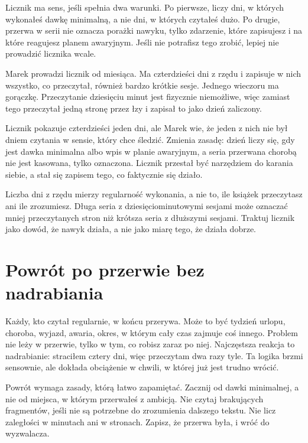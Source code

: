 Licznik ma sens, jeśli spełnia dwa warunki. Po pierwsze, liczy dni, w których wykonałeś dawkę minimalną, a nie dni, w których czytałeś dużo. Po drugie, przerwa w serii nie oznacza porażki nawyku, tylko zdarzenie, które zapisujesz i na które reagujesz planem awaryjnym. Jeśli nie potrafisz tego zrobić, lepiej nie prowadzić licznika wcale.

\begin{przyklad}
  Marek prowadzi licznik od miesiąca. Ma czterdzieści dni z rzędu i zapisuje w nich wszystko, co przeczytał, również bardzo krótkie sesje. Jednego wieczoru ma gorączkę. Przeczytanie dziesięciu minut jest fizycznie niemożliwe, więc zamiast tego przeczytał jedną stronę przez łzy i zapisał to jako dzień zaliczony.

  Licznik pokazuje czterdzieści jeden dni, ale Marek wie, że jeden z nich nie był dniem czytania w sensie, który chce śledzić. Zmienia zasadę: dzień liczy się, gdy jest dawka minimalna albo wpis w planie awaryjnym, a seria przerwana chorobą nie jest kasowana, tylko oznaczona. Licznik przestał być narzędziem do karania siebie, a stał się zapisem tego, co faktycznie się działo.
\end{przyklad}

\begin{uwaga}
  Liczba dni z rzędu mierzy regularność wykonania, a nie to, ile książek przeczytasz ani ile zrozumiesz. Długa seria z dziesięciominutowymi sesjami może oznaczać mniej przeczytanych stron niż krótsza seria z dłuższymi sesjami. Traktuj licznik jako dowód, że nawyk działa, a nie jako miarę tego, że działa dobrze.
\end{uwaga}

\section{Powrót po przerwie bez nadrabiania}

Każdy, kto czytał regularnie, w końcu przerywa. Może to być tydzień urlopu, choroba, wyjazd, awaria, okres, w którym cały czas zajmuje coś innego. Problem nie leży w przerwie, tylko w tym, co robisz zaraz po niej. Najczęstsza reakcja to nadrabianie: \glqq straciłem cztery dni, więc przeczytam dwa razy tyle\grqq{}. Ta logika brzmi sensownie, ale dokłada obciążenie w chwili, w której już jest trudno wrócić.

Powrót wymaga zasady, którą łatwo zapamiętać. Zacznij od dawki minimalnej, a nie od miejsca, w którym przerwałeś z ambicją. Nie czytaj brakujących fragmentów, jeśli nie są potrzebne do zrozumienia dalszego tekstu. Nie licz zaległości w minutach ani w stronach. Zapisz, że przerwa była, i wróć do wyzwalacza.

